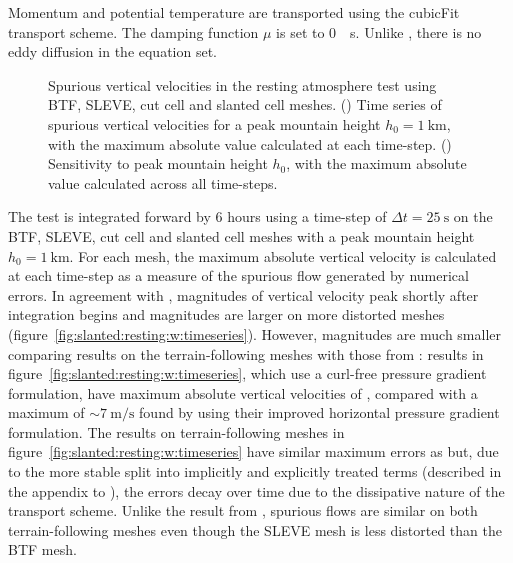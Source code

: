 Momentum and potential temperature are transported using the cubicFit transport scheme.
The damping function \(\mu\) is set to \SI{0}{\per\second}.  Unlike \citet{klemp2011}, there is no eddy diffusion in the equation set.

\begin{figure}
	\centering
	\begin{subfigure}{\textwidth}
		\centering
		
		\label{fig:slanted:resting:w:timeseries}
		\label{fig:slanted:resting:w:max}
	\end{subfigure}
	\caption{Spurious vertical velocities in the resting atmosphere test using BTF, SLEVE, cut cell and slanted cell meshes.
	() Time series of spurious vertical velocities for a peak mountain height $h_0 = \SI{1}{\kilo\meter}$, with the maximum absolute value calculated at each time-step. 
	() Sensitivity to peak mountain height $h_0$, with the maximum absolute value calculated across all time-steps.
	}
	\label{fig:slanted:resting:w}
\end{figure}

The test is integrated forward by \num{6} hours using a time-step of $\Delta t = \SI{25}{\second}$ on the BTF, SLEVE, cut cell and slanted cell meshes with a peak mountain height $h_0 = \SI{1}{\kilo\meter}$.
For each mesh, the maximum absolute vertical velocity is calculated at each time-step as a measure of the spurious flow generated by numerical errors.  In agreement with \citet{klemp2011}, magnitudes of vertical velocity peak shortly after integration begins and magnitudes are larger on more distorted meshes (figure~\ref{fig:slanted:resting:w:timeseries}).
However, magnitudes are much smaller comparing results on the terrain-following meshes with those from \citet{klemp2011}: results in figure~\ref{fig:slanted:resting:w:timeseries}, which use a curl-free pressure gradient formulation, have maximum absolute vertical velocities of \unskip, compared with a maximum of $\sim \SI{7}{\meter\per\second}$ found by \citet{klemp2011} using their improved horizontal pressure gradient formulation.
The results on terrain-following meshes in figure~\ref{fig:slanted:resting:w:timeseries} have similar maximum errors as \citet{weller-shahrokhi2014} but, due to the more stable split into implicitly and explicitly treated terms (described in the appendix to \citet{shaw-weller2016}), the errors decay over time due to the dissipative nature of the transport scheme.
Unlike the result from \citet{klemp2011}, spurious flows are similar on both terrain-following meshes even though the SLEVE mesh is less distorted than the BTF mesh.

